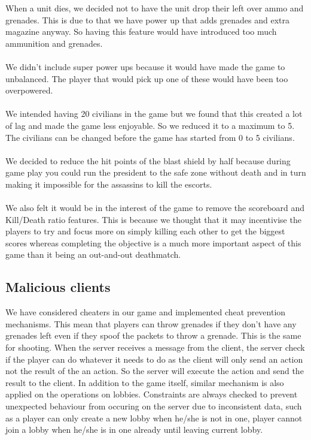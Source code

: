 \documentclass[12pt]{article}
\newcommand{\return}{\\\\\noindent}
\begin{document}
When a unit dies, we decided not to have the unit drop their left over ammo and grenades. This is due to that we have power up that adds grenades and extra magazine anyway. So having this feature would have introduced too much ammunition and grenades.\return
We didn't include super power ups because it would have made the game to unbalanced. The player that would pick up one of these would have been too overpowered.\return
We intended having 20 civilians in the game but we found that this created a lot of lag and made the game less enjoyable. So we reduced it to a maximum to 5. The civilians can be changed before the game has started from 0 to 5 civilians.\return
We decided to reduce the hit points of the blast shield by half because during game play you could run the president to the safe zone without death and in turn making it impossible for the assassins to kill the escorts.\return
We also felt it would be in the interest of the game to remove the scoreboard and Kill/Death ratio features. This is because we thought that it may incentivise the players to try and focus more on simply killing each other to get the biggest scores whereas completing the objective is a much more important aspect of this game than it being an out-and-out deathmatch.
\subsection{Malicious clients}
We have considered cheaters in our game and implemented cheat prevention mechanisms. This mean that players can throw grenades if they don't have any grenades left even if they spoof the packets to throw a grenade. This is the same for shooting. When the server receives a message from the client, the server check if the player can do whatever it needs to do as the client will only send an action not the result of the an action. So the server will execute the action and send the result to the client. In addition to the game itself, similar mechanism is also applied on the operations on lobbies. Constraints are always checked to prevent unexpected behaviour from occuring on the server due to inconsistent data, such as a player can only create a new lobby when he/she is not in one, player cannot join a lobby when he/she is in one already until leaving current lobby.
\newpage
\end{document}
